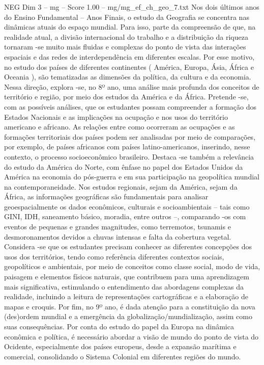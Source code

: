 \begin{textsample}{NEG Dim 3 – mg – Score 1.00 – mg/mg\_ef\_ch\_geo\_7.txt}  \label{ex:f3_neg_022}
Nos dois últimos anos do Ensino Fundamental – Anos Finais, o estudo da Geografia se concentra nas dinâmicas atuais do espaço mundial.
Para isso, parte da compreensão de que, na realidade atual, a divisão internacional do trabalho e a distribuição da riqueza tornaram -se muito mais fluidas e complexas do ponto de vista das interações espaciais e das redes de interdependência em diferentes escalas.
Por esse motivo, no estudo dos países de diferentes continentes ( América, Europa, Ásia, África e Oceania ), são tematizadas as dimensões da política, da cultura e da economia.
Nessa direção, explora -se, no 8º ano, uma análise mais profunda dos conceitos de território e região, por meio dos estudos da América e da África.
Pretende -se, com as possíveis análises, que os estudantes possam compreender a formação dos Estados Nacionais e as implicações na ocupação e nos usos do território americano e africano.
As relações entre como ocorreram as ocupações e as formações territoriais dos países podem ser analisadas por meio de comparações, por exemplo, de países africanos com países latino-americanos, inserindo, nesse contexto, o processo socioeconômico brasileiro.
Destaca -se também a relevância do estudo da América do Norte, com ênfase no papel dos Estados Unidos da América na economia do pós-guerra e em sua participação na geopolítica mundial na contemporaneidade.
Nos estudos regionais, sejam da América, sejam da África, as informações geográficas são fundamentais para analisar geoespacialmente os dados econômicos, culturais e socioambientais – tais como GINI, IDH, saneamento básico, moradia, entre outros –, comparando -os com eventos de pequenas e grandes magnitudes, como terremotos, tsunamis e desmoronamentos devidos a chuvas intensas e falta da cobertura vegetal.
Considera -se que os estudantes precisam conhecer as diferentes concepções dos usos dos territórios, tendo como referência diferentes contextos sociais, geopolíticos e ambientais, por meio de conceitos como classe social, modo de vida, paisagem e elementos físicos naturais, que contribuem para uma aprendizagem mais significativa, estimulando o entendimento das abordagens complexas da realidade, incluindo a leitura de representações cartográficas e a elaboração de mapas e croquis.
Por fim, no 9º ano, é dada atenção para a constituição da nova (des)ordem mundial e a emergência da globalização/mundialização, assim como suas consequências.
Por conta do estudo do papel da Europa na dinâmica econômica e política, é necessário abordar a visão de mundo do ponto de vista do Ocidente, especialmente dos países europeus, desde a expansão marítima e comercial, consolidando o Sistema Colonial em diferentes regiões do mundo.

\end{textsample}
